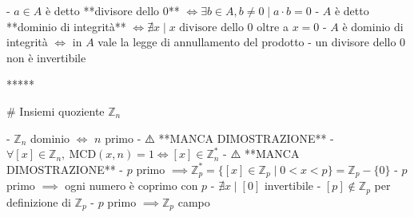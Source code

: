   - $a \in A$ è detto **divisore dello $0$** \( \iff \exists b \in A, b \neq 0 \mid a \cdot b=0 \)
    - $A$ è detto **dominio di integrità** $\iff \nexists x \mid x \textrm{  divisore dello 0}$ oltre a $x = 0$
    - $A$ è dominio di integrità $\iff$ in $A$ vale la legge di annullamento del prodotto
      - un divisore dello $0$ non è invertibile

*****

# Insiemi quoziente $\mathbb{Z}_n$

- $\mathbb{Z}_n$ dominio $\iff$ $n$ primo
      - ⚠️ **MANCA DIMOSTRAZIONE**
- $\forall [x] \in \mathbb{Z}_n, \ \textrm{MCD}(x, n) = 1 \iff [x] \in \mathbb{Z}^*_n$
      - ⚠️ **MANCA DIMOSTRAZIONE**
    - $p$ primo $\implies \mathbb{Z}_p^* = \{[x] \in \mathbb{Z}_p \mid  0 \lt x \lt p\} = \mathbb{Z}_p - \{0\}$
        - $p$ primo $\implies$ ogni numero è coprimo con $p$
        - $\nexists x \mid [0]$ invertibile
        - $[p] \notin \mathbb{Z}_p$ per definizione di $\mathbb{Z}_p$
        - $p$ primo $\implies \mathbb{Z}_p$ campo
